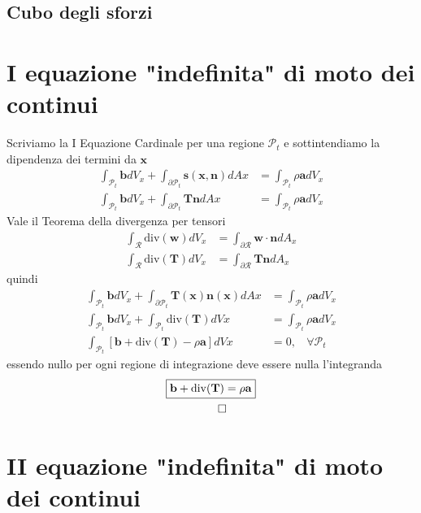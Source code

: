 \documentclass[10pt,a4paper,twoside]{book}
\begin{document}
\subsection{Cubo degli sforzi}


\section{I equazione "indefinita" di moto dei continui}

Scriviamo la I Equazione Cardinale per una regione $\mathcal{P}_{t}$ e sottintendiamo la dipendenza dei termini da $\mathbf{x}$
\begin{align*}
\int _{\mathcal{P}_{t}}\mathbf{b} dV_{x} +\int _{\partial \mathcal{P}_{t}}\mathbf{s}(\mathbf{x} ,\mathbf{n}) dAx & =\int _{\mathcal{P}_{t}} \rho \mathbf{a} dV_{x}\\
\int _{\mathcal{P}_{t}}\mathbf{b} dV_{x} +\int _{\partial \mathcal{P}_{t}}\mathbf{Tn} dAx & =\int _{\mathcal{P}_{t}} \rho \mathbf{a} dV_{x}
\end{align*}
Vale il Teorema della divergenza per tensori
\begin{align*}
\int _{\mathcal{R}}\mathrm{div}(\mathbf{w}) dV_{x} & =\int _{\partial \mathcal{R}}\mathbf{w} \cdotp \mathbf{n} dA_{x}\\
\int _{\mathcal{R}}\mathrm{div}(\mathbf{T}) dV_{x} & =\int _{\partial \mathcal{R}}\mathbf{Tn} dA_{x}
\end{align*}
quindi
\begin{align*}
\int _{\mathcal{P}_{t}}\mathbf{b} dV_{x} +\int _{\partial \mathcal{P}_{t}}\mathbf{T}(\mathbf{x})\mathbf{n}(\mathbf{x}) dAx & =\int _{\mathcal{P}_{t}} \rho \mathbf{a} dV_{x}\\
\int _{\mathcal{P}_{t}}\mathbf{b} dV_{x} +\int _{\mathcal{P}_{t}}\mathrm{div}(\mathbf{T}) dVx & =\int _{\mathcal{P}_{t}} \rho \mathbf{a} dV_{x}\\
\int _{\mathcal{P}_{t}}[\mathbf{b} +\mathrm{div}(\mathbf{T}) -\rho \mathbf{a}] dVx & =0,\ \ \ \ \forall \mathcal{P}_{t}
\end{align*}
essendo nullo per ogni regione di integrazione deve essere nulla l'integranda
\begin{gather*}
\boxed{\mathbf{b} +\mathrm{div}(\mathbf{T}) =\rho \mathbf{a}}\\
\qed 
\end{gather*}
\section{II equazione "indefinita" di moto dei continui}
\end{document}
